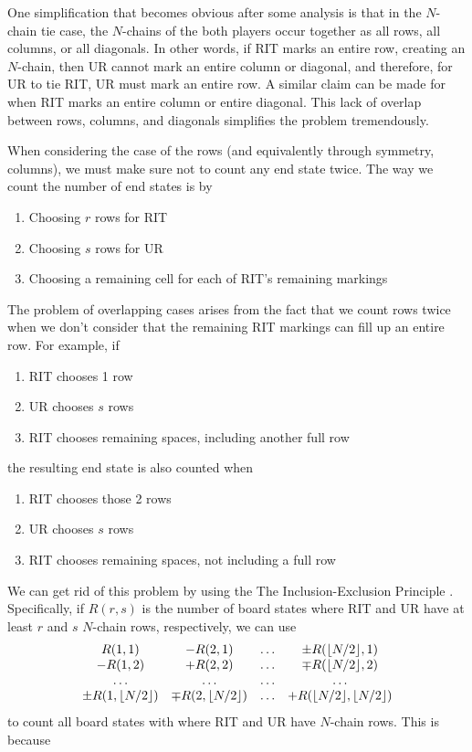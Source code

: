 \documentclass[12pt]{article}
\DeclarePairedDelimiter{\floor}{\lfloor}{\rfloor}
\theoremstyle{definition}
\theoremstyle{theorem}
\begin{document}
One simplification that becomes obvious after some analysis is that in the $N$-chain tie case, the $N$-chains of the both players occur together as all rows, all columns, or all diagonals. In other words, if RIT marks an entire row, creating an $N$-chain, then UR cannot mark an entire column or diagonal, and therefore, for UR to tie RIT, UR must mark an entire row. A similar claim can be made for when RIT marks an entire column or entire diagonal. This lack of overlap between rows, columns, and diagonals simplifies the problem tremendously.

When considering the case of the rows (and equivalently through symmetry, columns), we must make sure not to count any end state twice. The way we count the number of end states is by
\begin{enumerate}
\item Choosing $r$ rows for RIT
\item Choosing $s$ rows for UR
\item Choosing a remaining cell for each of RIT's remaining markings
\end{enumerate}
The problem of overlapping cases arises from the fact that we count rows twice when we don't consider that the remaining RIT markings can fill up an entire row. For example, if
\begin{enumerate}
\item RIT chooses 1 row
\item UR chooses $s$ rows
\item RIT chooses remaining spaces, including another full row
\end{enumerate}
the resulting end state is also counted when
\begin{enumerate}
\item RIT chooses those 2 rows
\item UR chooses $s$ rows
\item RIT chooses remaining spaces, not including a full row
\end{enumerate}
We can get rid of this problem by using the The Inclusion-Exclusion Principle \cite{iep}. Specifically, if $R(r,s)$ is the number of board states where RIT and UR have at least $r$ and $s$ $N$-chain rows, respectively, we can use
$$
\begin{matrix}
  R(1, 1) & - R(2, 1) & \ldots & \pm R(\floor{N/2}, 1)\\
  - R(1, 2) & + R(2, 2) & \ldots & \mp R(\floor{N/2}, 2)\\
  \hdots & \hdots & \hdots & \hdots \\
  \pm R(1, \floor{N/2}) & \mp R(2, \floor{N/2}) & \ldots & + R(\floor{N/2},\floor{N/2})
\end{matrix}
$$
to count all board states with where RIT and UR have $N$-chain rows. This is because
\end{document}
